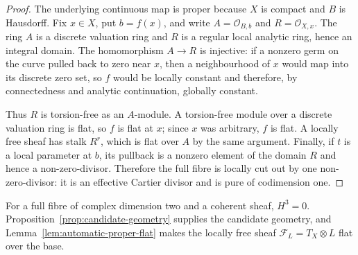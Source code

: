 
\begin{proof}
The underlying continuous map is proper because $X$ is compact and $B$ is
Hausdorff.  Fix $x\in X$, put $b=f(x)$, and write
$A=\mathcal O_{B,b}$ and $R=\mathcal O_{X,x}$.  The ring $A$ is a discrete
valuation ring and $R$ is a regular local analytic ring, hence an integral
domain.  The homomorphism $A\to R$ is injective: if a nonzero germ on the
curve pulled back to zero near $x$, then a neighbourhood of $x$ would map
into its discrete zero set, so $f$ would be locally constant and therefore,
by connectedness and analytic continuation, globally constant.

Thus $R$ is torsion-free as an $A$-module.  A torsion-free module over a
discrete valuation ring is flat, so $f$ is flat at $x$; since $x$ was
arbitrary, $f$ is flat.  A locally free sheaf has stalk $R^r$, which is flat
over $A$ by the same argument.  Finally, if $t$ is a local parameter at
$b$, its pullback is a nonzero element of the domain $R$ and hence a
non-zero-divisor.  Therefore the full fibre is locally cut out by one
non-zero-divisor: it is an effective Cartier divisor and is pure of
codimension one.
\end{proof}

For a full fibre of complex dimension two and a coherent sheaf, $H^3=0$.
Proposition~\ref{prop:candidate-geometry} supplies the candidate geometry,
and Lemma~\ref{lem:automatic-proper-flat} makes the locally free sheaf
$\mathcal F_L=T_X\otimes L$ flat over the base.


